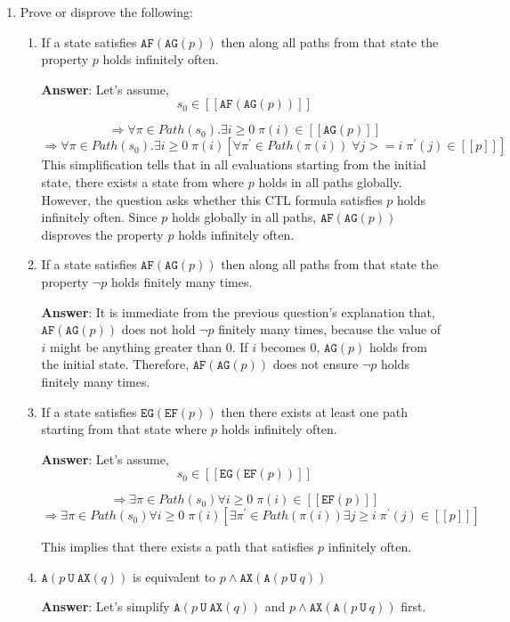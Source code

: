 \documentclass[11pt]{article}
\newcommand{\ax}[1]{\texttt{AX}(#1)}
\newcommand{\af}[1]{\texttt{AF}(#1)}
\newcommand{\ef}[1]{\texttt{EF}(#1)}
\newcommand{\ag}[1]{\texttt{AG}(#1)}
\newcommand{\eg}[1]{\texttt{EG}(#1)}
\newcommand{\au}[2]{\texttt{A}(#1\ \texttt{U}\ #2)}
\begin{document}
\begin{enumerate}
\item Prove or disprove the following:
  \begin{enumerate}
  \item
    If a state satisfies $\af{\ag{p}}$ then along all paths from that state the property $p$
    holds infinitely often.

    \textbf{Answer}: Let's assume, $$s_0 \in [[\af{\ag{p}}]]$$

    $$ \Rightarrow \forall \pi \in Path(s_0). \exists i \geq 0 \; \pi(i) \in [[\ag{p}]]$$
    $$ \Rightarrow \forall \pi \in Path(s_0). \exists i \geq 0 \; \pi(i) [ \forall \pi^\prime \in Path(\pi(i))\; \forall j >=i \; \pi^\prime(j) \in [[p]] ]$$
   This simplification tells that in all evaluations starting from the initial state, there exists a state from where $p$ holds in all paths globally. However, the question asks whether this CTL formula satisfies $p$
    holds infinitely often. Since $p$ holds globally in all paths, $\af{\ag{p}}$ disproves the property $p$
    holds infinitely often. 

    \item
    If a state satisfies $\af{\ag{p}}$ then along all paths from that state the property $\neg p$
    holds finitely many times. 
            
\textbf{Answer}: It is immediate from the previous question's explanation that, $\af{\ag{p}}$ does not hold $\neg p$ finitely many times, because the value of $i$ might be anything greater than 0. If $i$ becomes 0,  $\ag{p}$ holds from the initial state. Therefore, $\af{\ag{p}}$ does not ensure $\neg p$ holds finitely many times. 

  \item  If a state satisfies $\eg{\ef{p}}$ then there exists at least one path starting from that
    state where $p$ holds infinitely often.
    
\textbf{Answer}:
Let's assume, $$s_0 \in [[\eg{\ef{p}}]]$$

$$ \Rightarrow \exists \pi \in Path(s_0) \forall i \geq 0 \; \pi(i) \in [[\ef{p} ]]$$
$$\Rightarrow \exists \pi \in Path(s_0) \forall i \geq 0 \; \pi(i) [ \exists \pi^\prime \in Path(\pi(i)) \exists j \geq i \; \pi^\prime(j) \in [[p]]]$$

This implies that there exists a path that satisfies $p$ infinitely often. 
  
  \item $\au{p}{\ax{q}}$ is equivalent to $p \land \ax{\au{p}{q}}$

  \textbf{Answer}: Let's simplify  $\au{p}{\ax{q}}$ and $p \land \ax{\au{p}{q}}$ first. 


\end{enumerate}
\end{enumerate}
\end{document}
